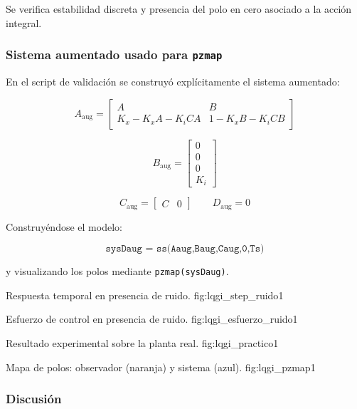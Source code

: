 Se verifica estabilidad discreta y presencia del polo en cero
asociado a la acción integral.

\subsubsection{Sistema aumentado usado para \texttt{pzmap}}

En el script de validación se construyó explícitamente el sistema aumentado:

\[
A_{\text{aug}} =
\begin{bmatrix}
	A & B \\
	K_x - K_xA - K_iCA & 1 - K_xB - K_iCB
\end{bmatrix}
\]

\[
B_{\text{aug}} =
\begin{bmatrix}
	0\\
	0\\
	0\\
	K_i
\end{bmatrix}
\]

\[
C_{\text{aug}} =
\begin{bmatrix}
	C & 0
\end{bmatrix}
\qquad
D_{\text{aug}} = 0
\]

Construyéndose el modelo:

\[
\texttt{sysDaug = ss(Aaug,Baug,Caug,0,Ts)}
\]

y visualizando los polos mediante \texttt{pzmap(sysDaug)}.


{Respuesta temporal en presencia de ruido.}
{fig:lqgi_step_ruido}{1}

{Esfuerzo de control en presencia de ruido.}
{fig:lqgi_esfuerzo_ruido}{1}

{Resultado experimental sobre la planta real.}
{fig:lqgi_practico}{1}

{Mapa de polos: observador (naranja) y sistema (azul).}
{fig:lqgi_pzmap}{1}

\subsubsection{Discusión}

